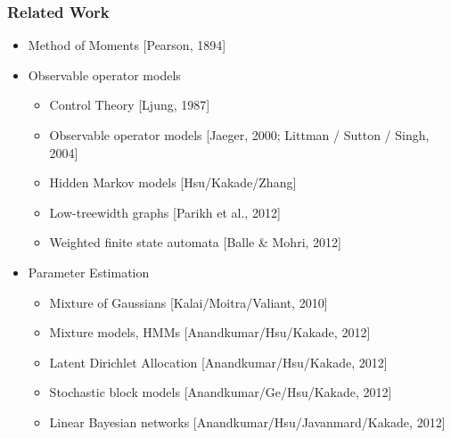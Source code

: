 \documentclass[xcolor={svgnames}]{beamer}
\begin{document}
\begin{frame}
  \frametitle{Related Work}
  \begin{itemize}
    \item<1-> Method of Moments [Pearson, 1894]
    \item<2-> Observable operator models
    \begin{itemize}
      \item Control Theory [Ljung, 1987]
      \item Observable operator models [Jaeger, 2000; Littman / Sutton / Singh, 2004]
      \item \alert<2>{Hidden Markov models [Hsu/Kakade/Zhang]}
      \item Low-treewidth graphs [Parikh et al., 2012]
      \item Weighted finite state automata [Balle \& Mohri, 2012]
    \end{itemize}
     \item<3-> Parameter Estimation
  \begin{itemize}
    \item Mixture of Gaussians [Kalai/Moitra/Valiant, 2010]
    \item \alert{Mixture models, HMMs [Anandkumar/Hsu/Kakade, 2012]}
    \item Latent Dirichlet Allocation [Anandkumar/Hsu/Kakade, 2012]
    \item Stochastic block models [Anandkumar/Ge/Hsu/Kakade, 2012]
    \item Linear Bayesian networks [Anandkumar/Hsu/Javanmard/Kakade, 2012]
  \end{itemize}
  \end{itemize}
\end{frame}
\end{document}
